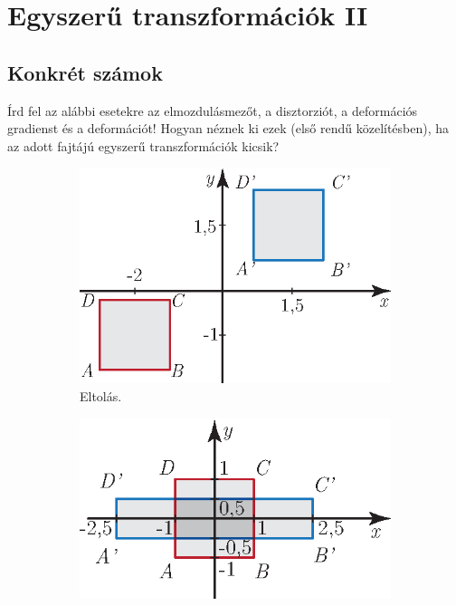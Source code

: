 \documentclass[12pt,a4paper]{scrartcl}
\begin{document}
\section{Egyszerű transzformációk II}
\subsection{Konkrét számok}
Írd fel az alábbi esetekre az elmozdulásmezőt, a disztorziót, a deformációs gradienst és a deformációt! Hogyan néznek ki ezek (első rendű közelítésben), ha az adott fajtájú egyszerű transzformációk kicsik?

\begin{figure}[htb] 
\centering
\begin{subfigure}[b]{0.45\textwidth}
\centering
\includegraphics[scale=1]{figs/eltolas_feladat.eps}
\caption{Eltolás.}
\label{fig:eltolas_feladat}
\end{subfigure} \hfill
\begin{subfigure}[b]{0.45\textwidth}
\centering
\includegraphics[scale=1]{figs/nyujtas_feladat.eps}

\end{subfigure}
\end{figure}
\end{document}
